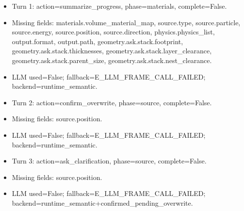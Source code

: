 \documentclass[11pt]{ctexart}
\begin{document}
\begin{itemize}
\item Turn 1: action=summarize\_progress, phase=materials, complete=False.
\item Missing fields: materials.volume\_material\_map, source.type, source.particle, source.energy, source.position, source.direction, physics.physics\_list, output.format, output.path, geometry.ask.stack.footprint, geometry.ask.stack.thicknesses, geometry.ask.stack.layer\_clearance, geometry.ask.stack.parent\_size, geometry.ask.stack.nest\_clearance.
\item LLM used=False; fallback=E\_LLM\_FRAME\_CALL\_FAILED; backend=runtime\_semantic.
\item Turn 2: action=confirm\_overwrite, phase=source, complete=False.
\item Missing fields: source.position.
\item LLM used=False; fallback=E\_LLM\_FRAME\_CALL\_FAILED; backend=runtime\_semantic.
\item Turn 3: action=ask\_clarification, phase=source, complete=False.
\item Missing fields: source.position.
\item LLM used=False; fallback=E\_LLM\_FRAME\_CALL\_FAILED; backend=runtime\_semantic+confirmed\_pending\_overwrite.
\end{itemize}
\end{document}
